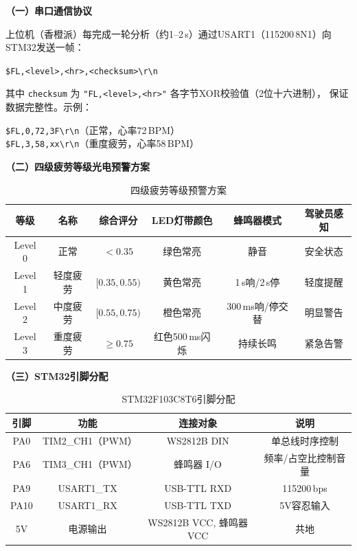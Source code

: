 \documentclass[a4paper,12pt]{article}
\begin{document}
\textbf{（一）串口通信协议}

上位机（香橙派）每完成一轮分析（约1--2\,s）通过USART1（115200\,8N1）向STM32发送一帧：
\begin{center}
  \texttt{\$FL,<level>,<hr>,<checksum>\textbackslash r\textbackslash n}
\end{center}
其中 \texttt{checksum} 为 \texttt{"FL,<level>,<hr>"} 各字节XOR校验值（2位十六进制），
保证数据完整性。示例：
\begin{center}
  \texttt{\$FL,0,72,3F\textbackslash r\textbackslash n}（正常，心率72\,BPM）\\
  \texttt{\$FL,3,58,xx\textbackslash r\textbackslash n}（重度疲劳，心率58\,BPM）
\end{center}

\textbf{（二）四级疲劳等级光电预警方案}

\begin{table}[H]
  \centering
  \caption{四级疲劳等级预警方案}
  \label{tab:warning_levels}
  \renewcommand{\arraystretch}{1.4}
  \begin{tabular}{|c|c|c|c|c|c|}
    \hline
    \textbf{等级} & \textbf{名称} & \textbf{综合评分} & \textbf{LED灯带颜色} & \textbf{蜂鸣器模式} & \textbf{驾驶员感知}\\
    \hline
    \rowcolor{lightgreen}
    Level 0 & 正常 & $<0.35$ & 绿色常亮 & 静音 & 安全状态\\
    \hline
    \rowcolor{lightyellow}
    Level 1 & 轻度疲劳 & $[0.35,0.55)$ & 黄色常亮 & 1\,s响/2\,s停 & 轻度提醒\\
    \hline
    \rowcolor{lightorange}
    Level 2 & 中度疲劳 & $[0.55,0.75)$ & 橙色常亮 & 300\,ms响/停交替 & 明显警告\\
    \hline
    \rowcolor{lightred}
    Level 3 & 重度疲劳 & $\geq0.75$ & 红色500\,ms闪烁 & 持续长鸣 & 紧急告警\\
    \hline
  \end{tabular}
\end{table}

\textbf{（三）STM32引脚分配}

\begin{table}[H]
  \centering
  \caption{STM32F103C8T6引脚分配}
  \renewcommand{\arraystretch}{1.3}
  \begin{tabular}{|c|c|c|c|}
    \hline
    \textbf{引脚} & \textbf{功能} & \textbf{连接对象} & \textbf{说明}\\
    \hline
    PA0 & TIM2\_CH1（PWM） & WS2812B DIN & 单总线时序控制\\
    \hline
    PA6 & TIM3\_CH1（PWM） & 蜂鸣器 I/O & 频率/占空比控制音量\\
    \hline
    PA9 & USART1\_TX & USB-TTL RXD & 115200\,bps\\
    \hline
    PA10 & USART1\_RX & USB-TTL TXD & 5V容忍输入\\
    \hline
    5V & 电源输出 & WS2812B VCC, 蜂鸣器VCC & 共地\\
    \hline
  \end{tabular}
\end{table}
\end{document}
